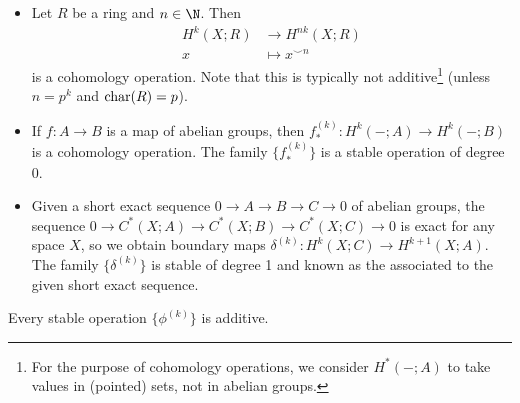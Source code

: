 \begin{example}
	\leavevmode
	\begin{itemize}
		\item Let $R$ be a ring and $n \in \N$.
			Then
			\begin{align*}
				H^k(X; R) &\to H^{n k}(X; R) \\
				x &\mapsto x^{\smile n}
			\end{align*}
			is a cohomology operation.
			Note that this is typically not additive\footnote{For the purpose of cohomology operations, we consider $H^*({{-}}; A)$ to take values in (pointed) sets, not in abelian groups.} (unless $n = p^k$ and $\operatorname{char}(R) = p$).
		\item If $f\colon A \to B$ is a map of abelian groups, then $f_*^{(k)}\colon H^k({{-}}; A) \to H^k({{-}}; B)$ is a cohomology operation.
			The family $\big\{f_*^{(k)}\big\}$ is a stable operation of degree 0.
		\item Given a short exact sequence $0 \to A \to B \to C \to 0$ of abelian groups, the sequence $0 \to C^*(X; A) \to C^*(X; B) \to C^*(X; C) \to 0$ is exact for any space $X$, so we obtain boundary maps $\delta^{(k)}\colon H^k(X; C) \to H^{k + 1}(X; A)$.
			The family $\big\{\delta^{(k)}\big\}$ is stable of degree 1 and known as the  associated to the given short exact sequence.
	\end{itemize}
\end{example}
\begin{lemma}
	Every stable operation $\big\{\phi^{(k)}\big\}$ is additive.
\end{lemma}

